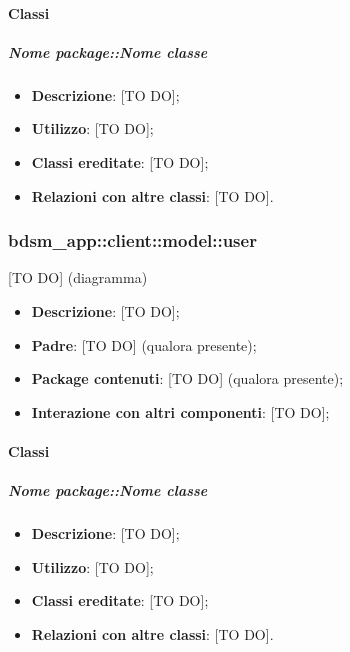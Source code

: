 		\paragraph{Classi} %
			\subparagraph{Nome package::Nome classe} %
			\label{subp:subparagraph_name}
				\begin{itemize}
					\item \textbf{Descrizione}: [TO DO];
					\item \textbf{Utilizzo}: [TO DO];
					\item \textbf{Classi ereditate}: [TO DO];
					\item \textbf{Relazioni con altre classi}: [TO DO].
				\end{itemize}	

	\subsubsection{bdsm\_app::client::model::user} %
	\label{ssub:bdsm_app_client_model_user}
	[TO DO] (diagramma) \newline \newline

	\begin{itemize}
		\item \textbf{Descrizione}: [TO DO];
		\item \textbf{Padre}: [TO DO] (qualora presente);
		\item \textbf{Package contenuti}: [TO DO] (qualora presente);
		\item \textbf{Interazione con altri componenti}: [TO DO];
	\end{itemize}

		\paragraph{Classi} %
			\subparagraph{Nome package::Nome classe} %
			\label{subp:subparagraph_name}
				\begin{itemize}
					\item \textbf{Descrizione}: [TO DO];
					\item \textbf{Utilizzo}: [TO DO];
					\item \textbf{Classi ereditate}: [TO DO];
					\item \textbf{Relazioni con altre classi}: [TO DO].
				\end{itemize}	

